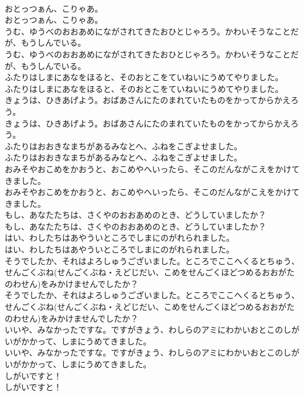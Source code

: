 \documentclass[8pt]{extreport}
\begin{document}
\begin{CJK}{UTF8}{min}
\\	おとっつぁん、こりゃあ。	
\\	おとっつぁん、こりゃあ。 
\\	うむ、ゆうべのおおあめにながされてきたおひとじゃろう。かわいそうなことだが、もうしんでいる。	
\\	うむ、ゆうべのおおあめにながされてきたおひとじゃろう。かわいそうなことだが、もうしんでいる。 
\\	ふたりはしまにあなをほると、そのおとこをていねいにうめてやりました。	
\\	ふたりはしまにあなをほると、そのおとこをていねいにうめてやりました。 
\\	きょうは、ひきあげよう。おばあさんにたのまれていたものをかってからかえろう。	
\\	きょうは、ひきあげよう。おばあさんにたのまれていたものをかってからかえろう。 
\\	ふたりはおおきなまちがあるみなとへ、ふねをこぎよせました。	
\\	ふたりはおおきなまちがあるみなとへ、ふねをこぎよせました。 
\\	おみそやおこめをかおうと、おこめやへいったら、そこのだんながこえをかけてきました。	
\\	おみそやおこめをかおうと、おこめやへいったら、そこのだんながこえをかけてきました。 
\\	もし、あなたたちは、さくやのおおあめのとき、どうしていましたか？	
\\	もし、あなたたちは、さくやのおおあめのとき、どうしていましたか？ 
\\	はい、わしたちはあやういところでしまにのがれられました。	
\\	はい、わしたちはあやういところでしまにのがれられました。 
\\	そうでしたか、それはよろしゅうございました。ところでここへくるとちゅう、せんごくぶね(せんごくぶね・えどじだい、こめをせんごくほどつめるおおがたのわせん)をみかけませんでしたか？	
\\	そうでしたか、それはよろしゅうございました。ところでここへくるとちゅう、せんごくぶね(せんごくぶね・えどじだい、こめをせんごくほどつめるおおがたのわせん)をみかけませんでしたか？ 
\\	いいや、みなかったですな。ですがきょう、わしらのアミにわかいおとこのしがいがかかって、しまにうめてきました。	
\\	いいや、みなかったですな。ですがきょう、わしらのアミにわかいおとこのしがいがかかって、しまにうめてきました。 
\\	しがいですと！	
\\	しがいですと！ 

\end{CJK}
\end{document}
